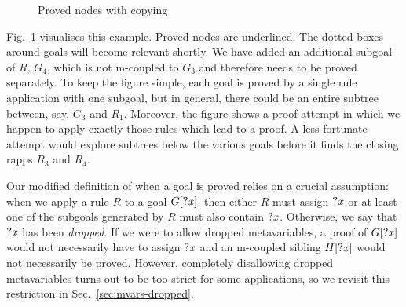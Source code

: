 \begin{figure}
  \caption{Proved nodes with copying}%
  \label{fig:mvars-proved}
\end{figure}

Fig.~\ref{fig:mvars-proved} visualises this example.
Proved nodes are underlined.
The dotted boxes around goals will become relevant shortly.
We have added an additional subgoal of $R$, $G_{4}$, which is not m-coupled to $G_{3}$ and therefore needs to be proved separately.
To keep the figure simple, each goal is proved by a single rule application with one subgoal, but in general, there could be an entire subtree between, say, $G_{3}$ and $R_{1}$.
Moreover, the figure shows a proof attempt in which we happen to apply exactly those rules which lead to a proof.
A less fortunate attempt would explore subtrees below the various goals before it finds the closing rapps $R_{3}$ and $R_{4}$.

Our modified definition of when a goal is proved relies on a crucial assumption: when we apply a rule $R$ to a goal $G[\mathit{?x}]$, then either $R$ must assign $\mathit{?x}$ or at least one of the subgoals generated by $R$ must also contain $\mathit{?x}$.
Otherwise, we say that $\mathit{?x}$ has been \emph{dropped}.
If we were to allow dropped metavariables, a proof of $G[\mathit{?x}]$ would not necessarily have to assign $\mathit{?x}$ and an m-coupled sibling $H[\mathit{?x}]$ would not necessarily be proved.
However, completely disallowing dropped metavariables turns out to be too strict for some applications, so we revisit this restriction in Sec.~\ref{sec:mvars-dropped}.



